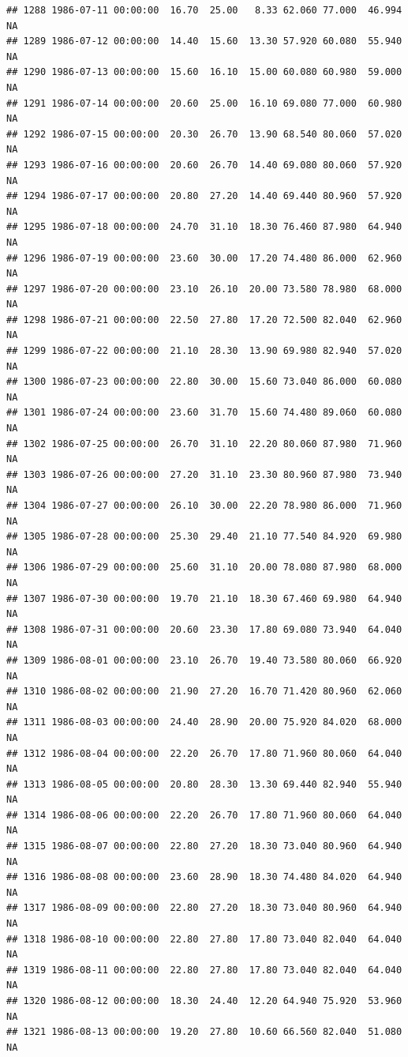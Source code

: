 \documentclass{article}\usepackage{graphicx, color}
\makeatletter
\newenvironment{kframe}{%
 \def\at@end@of@kframe{}%
 \ifinner\ifhmode%
  \def\at@end@of@kframe{\end{minipage}}%
  \begin{minipage}{\columnwidth}%
 \fi\fi%
 \def\FrameCommand##1{\hskip\@totalleftmargin \hskip-\fboxsep
 \colorbox{shadecolor}{##1}\hskip-\fboxsep
     \hskip-\linewidth \hskip-\@totalleftmargin \hskip\columnwidth}%
 \MakeFramed {\advance\hsize-\width
   \@totalleftmargin\z@ \linewidth\hsize
   \@setminipage}}%
 {\par\unskip\endMakeFramed%
 \at@end@of@kframe}
\newenvironment{knitrout}{}{} %
\makeatother
\begin{document}
\begin{knitrout}
\begin{kframe}
\begin{verbatim}
## 1288 1986-07-11 00:00:00  16.70  25.00   8.33 62.060 77.000  46.994     NA
## 1289 1986-07-12 00:00:00  14.40  15.60  13.30 57.920 60.080  55.940     NA
## 1290 1986-07-13 00:00:00  15.60  16.10  15.00 60.080 60.980  59.000     NA
## 1291 1986-07-14 00:00:00  20.60  25.00  16.10 69.080 77.000  60.980     NA
## 1292 1986-07-15 00:00:00  20.30  26.70  13.90 68.540 80.060  57.020     NA
## 1293 1986-07-16 00:00:00  20.60  26.70  14.40 69.080 80.060  57.920     NA
## 1294 1986-07-17 00:00:00  20.80  27.20  14.40 69.440 80.960  57.920     NA
## 1295 1986-07-18 00:00:00  24.70  31.10  18.30 76.460 87.980  64.940     NA
## 1296 1986-07-19 00:00:00  23.60  30.00  17.20 74.480 86.000  62.960     NA
## 1297 1986-07-20 00:00:00  23.10  26.10  20.00 73.580 78.980  68.000     NA
## 1298 1986-07-21 00:00:00  22.50  27.80  17.20 72.500 82.040  62.960     NA
## 1299 1986-07-22 00:00:00  21.10  28.30  13.90 69.980 82.940  57.020     NA
## 1300 1986-07-23 00:00:00  22.80  30.00  15.60 73.040 86.000  60.080     NA
## 1301 1986-07-24 00:00:00  23.60  31.70  15.60 74.480 89.060  60.080     NA
## 1302 1986-07-25 00:00:00  26.70  31.10  22.20 80.060 87.980  71.960     NA
## 1303 1986-07-26 00:00:00  27.20  31.10  23.30 80.960 87.980  73.940     NA
## 1304 1986-07-27 00:00:00  26.10  30.00  22.20 78.980 86.000  71.960     NA
## 1305 1986-07-28 00:00:00  25.30  29.40  21.10 77.540 84.920  69.980     NA
## 1306 1986-07-29 00:00:00  25.60  31.10  20.00 78.080 87.980  68.000     NA
## 1307 1986-07-30 00:00:00  19.70  21.10  18.30 67.460 69.980  64.940     NA
## 1308 1986-07-31 00:00:00  20.60  23.30  17.80 69.080 73.940  64.040     NA
## 1309 1986-08-01 00:00:00  23.10  26.70  19.40 73.580 80.060  66.920     NA
## 1310 1986-08-02 00:00:00  21.90  27.20  16.70 71.420 80.960  62.060     NA
## 1311 1986-08-03 00:00:00  24.40  28.90  20.00 75.920 84.020  68.000     NA
## 1312 1986-08-04 00:00:00  22.20  26.70  17.80 71.960 80.060  64.040     NA
## 1313 1986-08-05 00:00:00  20.80  28.30  13.30 69.440 82.940  55.940     NA
## 1314 1986-08-06 00:00:00  22.20  26.70  17.80 71.960 80.060  64.040     NA
## 1315 1986-08-07 00:00:00  22.80  27.20  18.30 73.040 80.960  64.940     NA
## 1316 1986-08-08 00:00:00  23.60  28.90  18.30 74.480 84.020  64.940     NA
## 1317 1986-08-09 00:00:00  22.80  27.20  18.30 73.040 80.960  64.940     NA
## 1318 1986-08-10 00:00:00  22.80  27.80  17.80 73.040 82.040  64.040     NA
## 1319 1986-08-11 00:00:00  22.80  27.80  17.80 73.040 82.040  64.040     NA
## 1320 1986-08-12 00:00:00  18.30  24.40  12.20 64.940 75.920  53.960     NA
## 1321 1986-08-13 00:00:00  19.20  27.80  10.60 66.560 82.040  51.080     NA

\end{verbatim}
\end{kframe}
\end{knitrout}
\end{document}
